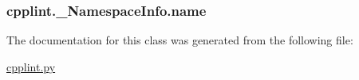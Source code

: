 \subsubsection[{\texorpdfstring{name}{name}}]{\setlength{\rightskip}{0pt plus 5cm}cpplint.\+\_\+\+Namespace\+Info.\+name}\hypertarget{classcpplint_1_1__NamespaceInfo_a6b518dae822e4e440405654e83dc86a1}{}\label{classcpplint_1_1__NamespaceInfo_a6b518dae822e4e440405654e83dc86a1}


The documentation for this class was generated from the following file\+:\begin{DoxyCompactItemize}
\item 
\hyperlink{cpplint_8py}{cpplint.\+py}\end{DoxyCompactItemize}
